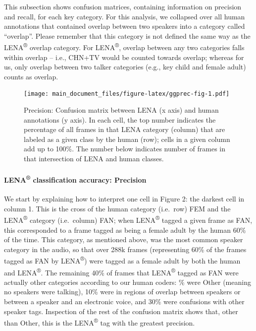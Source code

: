 \documentclass[english,table,man,floatsintext]{apa6}
\let\oldparagraph\paragraph
\renewcommand{\paragraph}[1]{\oldparagraph{#1}\mbox{}}
\begin{document}
This subsection shows confusion matrices, containing information on
precision and recall, for each key category. For this analysis, we
collapsed over all human annotations that contained overlap between two
speakers into a category called \enquote{overlap}. Please remember that
this category is not defined the same way as the LENA\textsuperscript{®}
overlap category. For LENA\textsuperscript{®}, overlap between any two
categories falls within overlap -- i.e., CHN+TV would be counted towards
overlap; whereas for us, only overlap between two talker categories
(e.g., key child and female adult) counts as overlap.

\begin{figure}
\centering
\texttt{[image: main\_document\_files/figure-latex/ggprec-fig-1.pdf]}
\caption{\label{fig:ggprec-fig}Precision: Confusion matrix between LENA (x
axis) and human annotations (y axis). In each cell, the top number
indicates the percentage of all frames in that LENA category (column)
that are labeled as a given class by the human (row); cells in a given
column add up to 100\%. The number below indicates number of frames in
that intersection of LENA and human classes.}
\end{figure}

\paragraph{\texorpdfstring{LENA\textsuperscript{®} classification
accuracy:
Precision}{LENA® classification accuracy: Precision}}\label{lena-classification-accuracy-precision}

We start by explaining how to interpret one cell in Figure 2: the
darkest cell in column 1. This is the cross of the human category
(i.e.~row) FEM and the LENA\textsuperscript{®} category (i.e.~column)
FAN; when LENA\textsuperscript{®} tagged a given frame as FAN, this
corresponded to a frame tagged as being a female adult by the human 60\%
of the time. This category, as mentioned above, was the most common
speaker category in the audio, so that over 288k frames (representing
60\% of the frames tagged as FAN by LENA\textsuperscript{®}) were tagged
as a female adult by both the human and LENA\textsuperscript{®}. The
remaining 40\% of frames that LENA\textsuperscript{®} tagged as FAN were
actually other categories according to our human coders: \% were Other
(meaning no speakers were talking), 10\% were in regions of overlap
between speakers or between a speaker and an electronic voice, and 30\%
were confusions with other speaker tags. Inspection of the rest of the
confusion matrix shows that, other than Other, this is the
LENA\textsuperscript{®} tag with the greatest precision.
\end{document}
